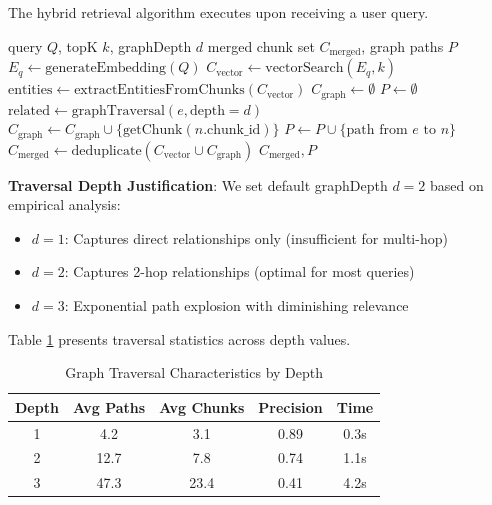 \documentclass[conference]{IEEEtran}
\begin{document}
The hybrid retrieval algorithm executes upon receiving a user query.

\begin{algorithm}[htbp]
\caption{Hybrid Retrieval}
\label{alg:hybrid}
\begin{algorithmic}[1]
\REQUIRE query $Q$, topK $k$, graphDepth $d$
\ENSURE merged chunk set $C_{\text{merged}}$, graph paths $P$
\STATE $E_q \gets \text{generateEmbedding}(Q)$
\STATE $C_{\text{vector}} \gets \text{vectorSearch}(E_q, k)$
\STATE $\text{entities} \gets \text{extractEntitiesFromChunks}(C_{\text{vector}})$
\STATE $C_{\text{graph}} \gets \emptyset$
\STATE $P \gets \emptyset$
    \STATE $\text{related} \gets \text{graphTraversal}(e, \text{depth}=d)$
            \STATE $C_{\text{graph}} \gets C_{\text{graph}} \cup \{\text{getChunk}(n.\text{chunk\_id})\}$
        \ENDIF
        \STATE $P \gets P \cup \{\text{path from } e \text{ to } n\}$
    \ENDFOR
\ENDFOR
\STATE $C_{\text{merged}} \gets \text{deduplicate}(C_{\text{vector}} \cup C_{\text{graph}})$
\RETURN $C_{\text{merged}}, P$
\end{algorithmic}
\end{algorithm}

\textbf{Traversal Depth Justification}: We set default graphDepth $d = 2$ based on empirical analysis:
\begin{itemize}
    \item $d = 1$: Captures direct relationships only (insufficient for multi-hop)
    \item $d = 2$: Captures 2-hop relationships (optimal for most queries)
    \item $d = 3$: Exponential path explosion with diminishing relevance
\end{itemize}

Table \ref{tab:traversal} presents traversal statistics across depth values.

\begin{table}[htbp]
\caption{Graph Traversal Characteristics by Depth}
\label{tab:traversal}
\centering
\begin{tabular}{ccccc}
\toprule
\textbf{Depth} & \textbf{Avg Paths} & \textbf{Avg Chunks} & \textbf{Precision} & \textbf{Time} \\
\midrule
1 & 4.2 & 3.1 & 0.89 & 0.3s \\
2 & 12.7 & 7.8 & 0.74 & 1.1s \\
3 & 47.3 & 23.4 & 0.41 & 4.2s \\
\bottomrule
\end{tabular}
\end{table}
\end{document}
